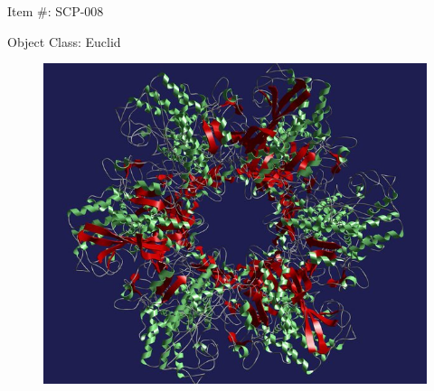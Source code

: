 \documentclass[a4paper, 11pt]{article}
\begin{document}
Item \#: SCP-008

Object Class: Euclid

\begin{figure}
\includegraphics[scale=0.33]{img/scp/008.jpg}
\end{figure}
\end{document}
